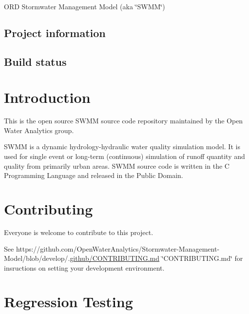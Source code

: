O\+RD Stormwater Management Model (aka \char`\"{}\+S\+W\+M\+M\char`\"{})

\subsection*{Project information}

\href{https://github.com/OpenWaterAnalytics/Stormwater-Management-Model}{\tt } \href{https://gitter.im/OpenWaterAnalytics/lobby}{\tt } \href{http://wateranalytics.org/Stormwater-Management-Model/}{\tt }

\subsection*{Build status}

\href{https://ci.appveyor.com/project/OpenWaterAnalytics/stormwater-management-model/branch/develop}{\tt } \href{https://travis-ci.org/OpenWaterAnalytics/Stormwater-Management-Model}{\tt }

\section*{Introduction}

This is the open source S\+W\+MM source code repository maintained by the Open Water Analytics group.

S\+W\+MM is a dynamic hydrology-\/hydraulic water quality simulation model. It is used for single event or long-\/term (continuous) simulation of runoff quantity and quality from primarily urban areas. S\+W\+MM source code is written in the C Programming Language and released in the Public Domain.

\section*{Contributing}

Everyone is welcome to contribute to this project.

See https\+://github.com/\+Open\+Water\+Analytics/\+Stormwater-\/\+Management-\/\+Model/blob/develop/.\hyperlink{_c_o_n_t_r_i_b_u_t_i_n_g_8md_source}{github/\+C\+O\+N\+T\+R\+I\+B\+U\+T\+I\+N\+G.\+md} \char`\"{}\+C\+O\+N\+T\+R\+I\+B\+U\+T\+I\+N\+G.\+md\char`\"{} for insructions on setting your development environment.

\section*{Regression Testing}

